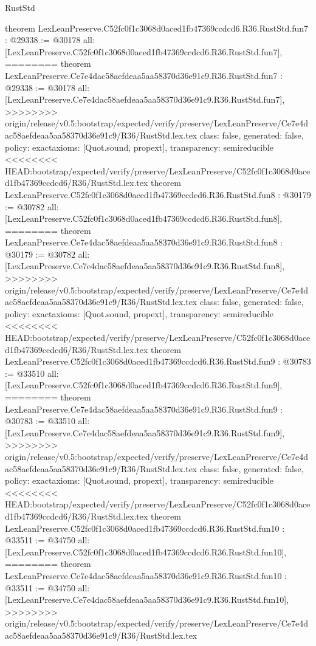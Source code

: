 \begin{lexlean}{RustStd}
\begin{coremodule}
{\begin{coremodule}
{{{{{{{{{theorem LexLeanPreserve.C52fc0f1c3068d0aced1fb47369ccdcd6.R36.RustStd.fun7 : @29338 := @30178 {
  all: [LexLeanPreserve.C52fc0f1c3068d0aced1fb47369ccdcd6.R36.RustStd.fun7],
========
theorem LexLeanPreserve.Ce7e4dac58aefdeaa5aa58370d36e91c9.R36.RustStd.fun7 : @29338 := @30178 {
  all: [LexLeanPreserve.Ce7e4dac58aefdeaa5aa58370d36e91c9.R36.RustStd.fun7],
>>>>>>>> origin/release/v0.5:bootstrap/expected/verify/preserve/LexLeanPreserve/Ce7e4dac58aefdeaa5aa58370d36e91c9/R36/RustStd.lex.tex
  class: false,
  generated: false,
  policy: exact{axioms: [Quot.sound, propext]},
  transparency: semireducible
}
<<<<<<<< HEAD:bootstrap/expected/verify/preserve/LexLeanPreserve/C52fc0f1c3068d0aced1fb47369ccdcd6/R36/RustStd.lex.tex
theorem LexLeanPreserve.C52fc0f1c3068d0aced1fb47369ccdcd6.R36.RustStd.fun8 : @30179 := @30782 {
  all: [LexLeanPreserve.C52fc0f1c3068d0aced1fb47369ccdcd6.R36.RustStd.fun8],
========
theorem LexLeanPreserve.Ce7e4dac58aefdeaa5aa58370d36e91c9.R36.RustStd.fun8 : @30179 := @30782 {
  all: [LexLeanPreserve.Ce7e4dac58aefdeaa5aa58370d36e91c9.R36.RustStd.fun8],
>>>>>>>> origin/release/v0.5:bootstrap/expected/verify/preserve/LexLeanPreserve/Ce7e4dac58aefdeaa5aa58370d36e91c9/R36/RustStd.lex.tex
  class: false,
  generated: false,
  policy: exact{axioms: [Quot.sound, propext]},
  transparency: semireducible
}
<<<<<<<< HEAD:bootstrap/expected/verify/preserve/LexLeanPreserve/C52fc0f1c3068d0aced1fb47369ccdcd6/R36/RustStd.lex.tex
theorem LexLeanPreserve.C52fc0f1c3068d0aced1fb47369ccdcd6.R36.RustStd.fun9 : @30783 := @33510 {
  all: [LexLeanPreserve.C52fc0f1c3068d0aced1fb47369ccdcd6.R36.RustStd.fun9],
========
theorem LexLeanPreserve.Ce7e4dac58aefdeaa5aa58370d36e91c9.R36.RustStd.fun9 : @30783 := @33510 {
  all: [LexLeanPreserve.Ce7e4dac58aefdeaa5aa58370d36e91c9.R36.RustStd.fun9],
>>>>>>>> origin/release/v0.5:bootstrap/expected/verify/preserve/LexLeanPreserve/Ce7e4dac58aefdeaa5aa58370d36e91c9/R36/RustStd.lex.tex
  class: false,
  generated: false,
  policy: exact{axioms: [Quot.sound, propext]},
  transparency: semireducible
}
<<<<<<<< HEAD:bootstrap/expected/verify/preserve/LexLeanPreserve/C52fc0f1c3068d0aced1fb47369ccdcd6/R36/RustStd.lex.tex
theorem LexLeanPreserve.C52fc0f1c3068d0aced1fb47369ccdcd6.R36.RustStd.fun10 : @33511 := @34750 {
  all: [LexLeanPreserve.C52fc0f1c3068d0aced1fb47369ccdcd6.R36.RustStd.fun10],
========
theorem LexLeanPreserve.Ce7e4dac58aefdeaa5aa58370d36e91c9.R36.RustStd.fun10 : @33511 := @34750 {
  all: [LexLeanPreserve.Ce7e4dac58aefdeaa5aa58370d36e91c9.R36.RustStd.fun10],
>>>>>>>> origin/release/v0.5:bootstrap/expected/verify/preserve/LexLeanPreserve/Ce7e4dac58aefdeaa5aa58370d36e91c9/R36/RustStd.lex.tex
}}}}}}}}}}}}}}
\end{coremodule}}
\end{coremodule}
\end{lexlean}
